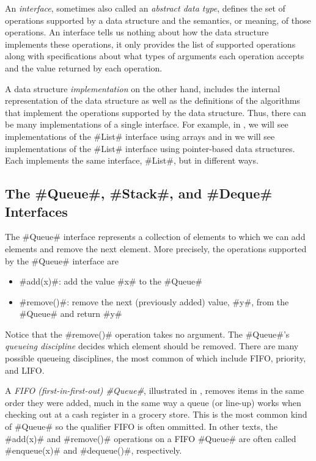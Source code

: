An \emph{interface}, sometimes also called an \emph{abstract data type},
defines the set of operations supported by a data structure and
the semantics, or meaning, of those operations.  An interface tells us
nothing about how the data structure implements these operations, it only
provides the list of supported operations along with specifications
about what types of arguments each operation accepts and the value
returned by each operation.

A data structure \emph{implementation} on the other hand, includes the
internal representation of the data structure as well as the definitions
of the algorithms that implement the operations supported by the data
structure.  Thus, there can be many implementations of a single interface.
For example, in , we will see implementations of the
#List# interface using arrays and in  we will
see implementations of the #List# interface using pointer-based data
structures.  Each implements the same interface, #List#,
but in different ways.

\subsection{The #Queue#, #Stack#, and #Deque# Interfaces}

The #Queue# interface represents a collection of elements to which we
can add elements and remove the next element.  More precisely, the operations
supported by the #Queue# interface are
\begin{itemize}
  \item #add(x)#: add the value #x# to the #Queue#
  \item #remove()#: remove the next (previously added) value, #y#, from the #Queue# and return #y#
\end{itemize}
Notice that the #remove()# operation takes no argument.  The #Queue#'s
\emph{queueing discipline} decides which element should be removed.
There are many possible queueing disciplines, the most common of which
include FIFO, priority, and LIFO.

A \emph{FIFO (first-in-first-out) #Queue#}, illustrated in ,
removes items in the same order they were added, much in the same
way a queue (or line-up) works when checking out at a cash register
in a grocery store.  This is the most common kind of #Queue# so the
qualifier FIFO is often ommitted.  In other texts, the #add(x)# and
#remove()# operations on a FIFO #Queue# are often called #enqueue(x)#
and #dequeue()#, respectively.

